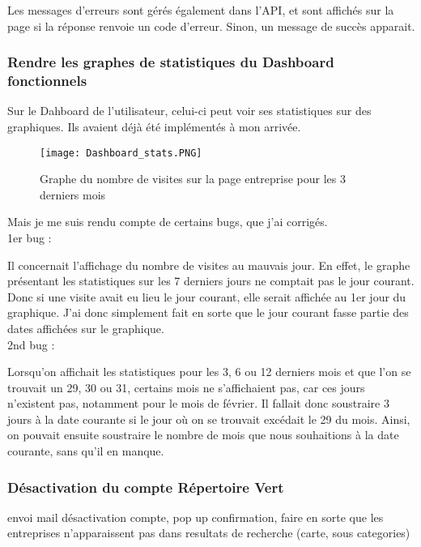Les messages d'erreurs sont gérés également dans l'API, et sont affichés sur la page si la réponse renvoie un code d'erreur. Sinon, un message de succès apparait.

\subsubsection{Rendre les graphes de statistiques du Dashboard fonctionnels}

Sur le Dahboard de l'utilisateur, celui-ci peut voir ses statistiques sur des graphiques. 
Ils avaient déjà été implémentés à mon arrivée.

\begin{figure}[H]
    \texttt{[image: Dashboard\_stats.PNG]}
    \caption{Graphe du nombre de visites sur la page entreprise pour les 3 derniers mois}
\end{figure}

Mais je me suis rendu compte de certains bugs, que j'ai corrigés.\\

1er bug :

Il concernait l'affichage du nombre de visites au mauvais jour. En effet, le graphe présentant les statistiques sur les 7 derniers jours ne comptait pas le jour courant.
Donc si une visite avait eu lieu le jour courant, elle serait affichée au 1er jour du graphique. 
J'ai donc simplement fait en sorte que le jour courant fasse partie des dates affichées sur le graphique.\\

2nd bug :

Lorsqu'on affichait les statistiques pour les 3, 6 ou 12 derniers mois et que l'on se trouvait un 29, 30 ou 31, certains mois ne s'affichaient pas, car ces jours n'existent pas, notamment pour le mois de février.
Il fallait donc soustraire 3 jours à la date courante si le jour où on se trouvait excédait le 29 du mois.
Ainsi, on pouvait ensuite soustraire le nombre de mois que nous souhaitions à la date courante, sans qu'il en manque.

\subsubsection{Désactivation du compte Répertoire Vert}
envoi mail désactivation compte, pop up confirmation, faire en sorte que les entreprises n'apparaissent pas dans resultats de recherche (carte, sous categories)

